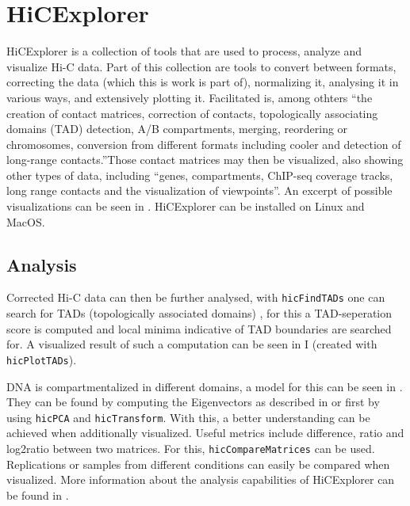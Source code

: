 \section{HiCExplorer}\label{sec:hicexplorer}



HiCExplorer \cite{wolff2018galaxy} is a collection of tools that are used to
process, analyze and visualize Hi-C data. Part of this collection are tools to
convert between formats, correcting the data (which this is work is part of),
normalizing it, analysing it in various ways, and extensively plotting it.
Facilitated is, among othters ``the creation of contact matrices, correction of
contacts, topologically associating domains (TAD) detection, A/B compartments,
merging, reordering or chromosomes, conversion from different formats including
cooler and detection of long-range contacts.''\footnotemark Those contact
matrices may then be visualized, also showing other types of data, including
``genes, compartments, ChIP-seq coverage tracks, long range contacts and the
visualization of viewpoints''\footnotemark[\value{footnote}]. An excerpt of
possible visualizations can be seen in . HiCExplorer
can be installed on Linux and MacOS.




\subsection{Analysis}\label{sec:analysis}



Corrected Hi-C data can then be further analysed, with \verb|hicFindTADs| one
can search for TADs (topologically associated domains) \cite{ramirez2018high},
for this a TAD-seperation score is computed and local minima indicative of TAD
boundaries are searched for. A visualized result of such a computation can be
seen in I (created with \verb|hicPlotTADs|).

DNA is compartmentalized \cite{lieberman2009comprehensive} in different
domains, a model for this can be seen in . They
can be found by computing the Eigenvectors as described in
\cite{lieberman2009comprehensive} or \cite{imakaev2012iterative} first by using
\verb|hicPCA| and \verb|hicTransform|. With this, a better understanding can be
achieved when additionally visualized. Useful metrics include difference, ratio
and log2ratio between two matrices. For this, \verb|hicCompareMatrices| can be
used.  Replications or samples from different conditions can easily be compared
when visualized. More information about the analysis capabilities of
HiCExplorer can be found in \cite{wolff2018galaxy}.

